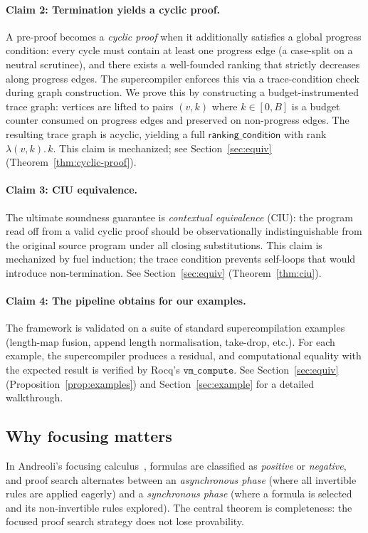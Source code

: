 \paragraph{Claim 2: Termination yields a cyclic proof.}
A pre-proof becomes a \emph{cyclic proof} when it additionally satisfies a global progress condition: every cycle must contain at least one progress edge (a case-split on a neutral scrutinee), and there exists a well-founded ranking that strictly decreases along progress edges.
The supercompiler enforces this via a trace-condition check during graph construction.
We prove this by constructing a budget-instrumented trace graph: vertices are lifted to pairs $(v,k)$ where $k \in [0, B]$ is a budget counter consumed on progress edges and preserved on non-progress edges.
The resulting trace graph is acyclic, yielding a full $\mathsf{ranking\_condition}$ with rank $\lambda(v,k).\,k$.
This claim is mechanized; see Section~\ref{sec:equiv} (Theorem~\ref{thm:cyclic-proof}).

\paragraph{Claim 3: CIU equivalence.}
The ultimate soundness guarantee is \emph{contextual equivalence} (CIU): the program read off from a valid cyclic proof should be observationally indistinguishable from the original source program under all closing substitutions.
This claim is mechanized by fuel induction; the trace condition prevents self-loops that would introduce non-termination.
See Section~\ref{sec:equiv} (Theorem~\ref{thm:ciu}).

\paragraph{Claim 4: The pipeline obtains for our examples.}
The framework is validated on a suite of standard supercompilation examples (length-map fusion, append length normalisation, take-drop, etc.).
For each example, the supercompiler produces a residual, and computational equality with the expected result is verified by Rocq's $\mathtt{vm\_compute}$.
See Section~\ref{sec:equiv} (Proposition~\ref{prop:examples}) and Section~\ref{sec:example} for a detailed walkthrough.

\subsection{Why focusing matters}

In Andreoli's focusing calculus~\cite{andreoli-1992-logic-programming}, formulas are classified as \emph{positive} or \emph{negative}, and proof search alternates between an \emph{asynchronous phase} (where all invertible rules are applied eagerly) and a \emph{synchronous phase} (where a formula is selected and its non-invertible rules explored). The central theorem is completeness: the focused proof search strategy does not lose provability.

